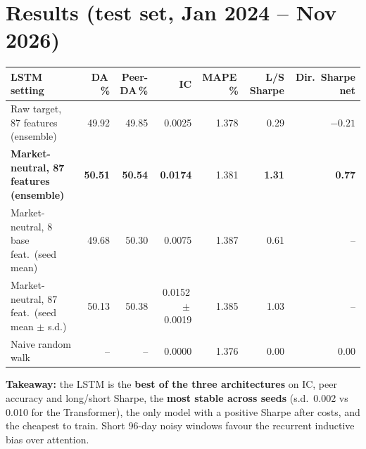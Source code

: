 \documentclass[10pt,a4paper]{article}
\begin{document}
\section{Results (test set, Jan 2024 -- Nov 2026)}
\begin{center}\footnotesize\setlength\tabcolsep{4pt}
\begin{tabular}{lrrrrrr}
\toprule
LSTM setting & DA\,\% & Peer-DA\,\% & IC & MAPE\,\% & L/S Sharpe & Dir.\ Sharpe net\\\midrule
Raw target, 87 features (ensemble) & 49.92 & 49.85 & 0.0025 & 1.378 & 0.29 & $-0.21$\\
\textbf{Market-neutral, 87 features (ensemble)} & \textbf{50.51} & \textbf{50.54} & \textbf{0.0174} & 1.381 & \textbf{1.31} & \textbf{0.77}\\
Market-neutral, 8 base feat.\ (seed mean) & 49.68 & 50.30 & 0.0075 & 1.387 & 0.61 & --\\
Market-neutral, 87 feat.\ (seed mean $\pm$ s.d.) & 50.13 & 50.38 & 0.0152\,$\pm$\,0.0019 & 1.385 & 1.03 & --\\
Naive random walk & -- & -- & 0.0000 & 1.376 & 0.00 & 0.00\\\bottomrule
\end{tabular}
\end{center}
\textbf{Takeaway:} the LSTM is the \textbf{best of the three architectures} on IC, peer accuracy and long/short Sharpe, the \textbf{most stable across seeds} (s.d.\ 0.002 vs 0.010 for the Transformer), the only model with a positive Sharpe after costs, and the cheapest to train. Short 96-day noisy windows favour the recurrent inductive bias over attention.
\end{document}
